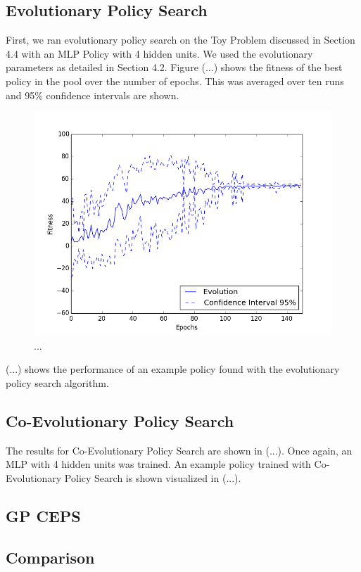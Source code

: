 \subsection{Evolutionary Policy Search}

First, we ran evolutionary policy search on the Toy Problem discussed in Section 4.4 with an MLP Policy with 4 hidden units. We used the evolutionary parameters as detailed in Section 4.2. Figure (...) shows the fitness of the best policy in the pool over the number of epochs. This was averaged over ten runs and 95\% confidence intervals are shown.

\begin{figure}[ht]
  \centering
  \includegraphics[scale=0.5]{images/evo.png}
  \caption{...}\label{Fitness during Evolutionary Algorithm}
\end{figure}

(...) shows the performance of an example policy found with the evolutionary policy search algorithm. 

\subsection{Co-Evolutionary Policy Search}

The results for Co-Evolutionary Policy Search are shown in (...). Once again, an MLP with 4 hidden units was trained. An example policy trained with Co-Evolutionary Policy Search is shown visualized in (...).

\subsection{GP CEPS}

\subsection{Comparison}

